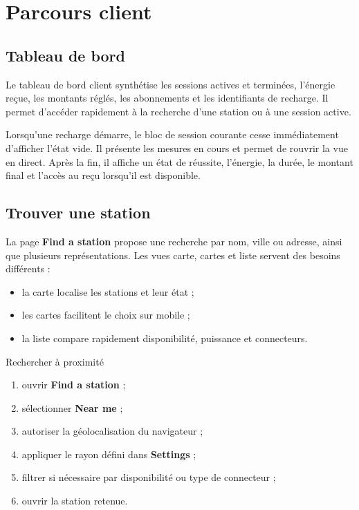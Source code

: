 \chapter{Parcours client}

\section{Tableau de bord}

Le tableau de bord client synthétise les sessions actives et terminées, l'énergie
reçue, les montants réglés, les abonnements et les identifiants de recharge. Il
permet d'accéder rapidement à la recherche d'une station ou à une session active.

Lorsqu'une recharge démarre, le bloc de session courante cesse immédiatement
d'afficher l'état vide. Il présente les mesures en cours et permet de rouvrir la
vue en direct. Après la fin, il affiche un état de réussite, l'énergie, la durée,
le montant final et l'accès au reçu lorsqu'il est disponible.


\section{Trouver une station}

La page \textbf{Find a station} propose une recherche par nom, ville ou adresse,
ainsi que plusieurs représentations. Les vues carte, cartes et liste servent des
besoins différents :

\begin{itemize}[leftmargin=1.6em]
  \item la carte localise les stations et leur état ;
  \item les cartes facilitent le choix sur mobile ;
  \item la liste compare rapidement disponibilité, puissance et connecteurs.
\end{itemize}

\begin{procedurebox}{Rechercher à proximité}
  \begin{enumerate}[leftmargin=1.6em]
    \item ouvrir \textbf{Find a station} ;
    \item sélectionner \textbf{Near me} ;
    \item autoriser la géolocalisation du navigateur ;
    \item appliquer le rayon défini dans \textbf{Settings} ;
    \item filtrer si nécessaire par disponibilité ou type de connecteur ;
    \item ouvrir la station retenue.
  \end{enumerate}
\end{procedurebox}

